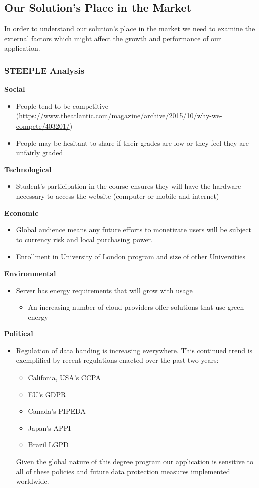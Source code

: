 \documentclass{article}
\begin{document}
\subsection{Our Solution's Place in the Market}
In order to understand our solution's place in the market we need to examine the external factors which might affect the growth and performance of our application.
\subsubsection{STEEPLE Analysis}
\textbf{Social}
\begin{itemize}
    \item People tend to be competitive (\url{https://www.theatlantic.com/magazine/archive/2015/10/why-we-compete/403201/})
    \item People may be hesitant to share if their grades are low or they feel they are unfairly graded
\end{itemize}
\textbf{Technological}
\begin{itemize}
    \item Student's participation in the course ensures they will have the hardware necessary to access the website (computer or mobile and internet)
\end{itemize}
\textbf{Economic}
\begin{itemize}
    \item Global audience means any future efforts to monetizate users will be subject to currency risk and local purchasing power.
    \item Enrollment in University of London program and size of other Universities
\end{itemize}
\textbf{Environmental}
\begin{itemize}
    \item Server has energy requirements that will grow with usage
    \begin{itemize}
        \item An increasing number of cloud providers offer solutions that use green energy
\end{itemize}
\end{itemize}
\textbf{Political}
\begin{itemize}
    \item Regulation of data handing is increasing everywhere. This continued trend is exemplified by recent regulations enacted over the past two years:
    \begin{itemize}
        \item Califonia, USA's CCPA
        \item EU's GDPR
        \item Canada's PIPEDA
        \item Japan's APPI 
        \item Brazil LGPD
    \end{itemize}
    Given the global nature of this degree program our application is sensitive to all of these policies and future data protection measures implemented worldwide.
\end{itemize}
\end{document}
